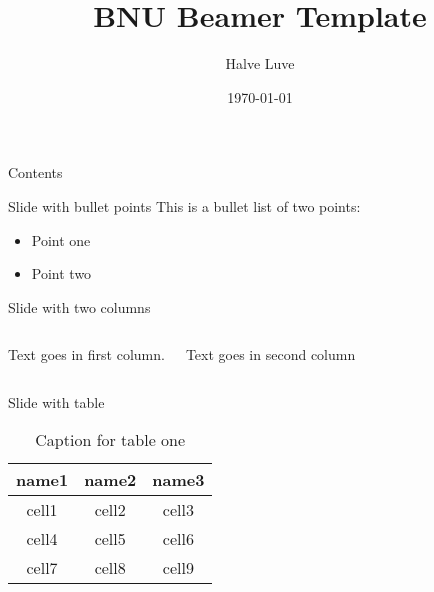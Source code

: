 \documentclass[aspectratio=169,xcolor=dvipsnames, t]{beamer}
\title[BNU-beamer]{BNU Beamer Template} %
\author{Halve Luve}
\institute[BNU-AI]{School of Artificial Intelligence, Beijing Normal University}
\date{\today} %
\let\oldsection\section
\renewcommand{\section}[2][\relax]{%
    \ifx#1\relax
      \oldsection{#2}%
    \else
      \oldsection[#1]{#2}%
    \fi%
    \label{sec:\thesection}%
}
\begin{document}
\maketitlepage
\begin{frame}[t]{Contents}
    \tableofcontents
\end{frame}

    \begin{frame}{Slide with bullet points}
        This is a bullet list of two points:
        \begin{itemize}
            \item Point one
            \item Point two
        \end{itemize}
    \end{frame}

    \begin{frame}{Slide with two columns}
        \begin{columns}
            Text goes in first column.
            
            Text goes in second column
        \end{columns}
    \end{frame}

    \begin{frame}{Slide with table}
        \begin{table}
            \centering
            \begin{tabular}{ccc}
                \hline
                \textbf{name1} & \textbf{name2} & \textbf{name3} \\
                \hline 
                cell1 & cell2 & cell3 \\ 
                cell4 & cell5 & cell6 \\ 
                cell7 & cell8 & cell9 \\ 
                \hline
            \end{tabular}
            \caption{Caption for table one}
            \label{tab:table1}
        \end{table}
    \end{frame}
\end{document}
